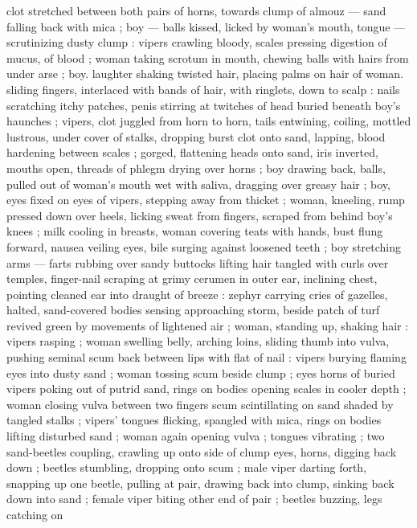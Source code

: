 clot stretched between both pairs of horns, towards clump of almouz 
--- sand falling back with mica ; boy --- balls kissed, licked by 
woman's mouth, tongue --- scrutinizing dusty clump : vipers crawling 
bloody, scales pressing digestion of mucus, of blood ; woman taking 
scrotum in mouth, chewing balls with hairs from under arse ; boy. 
laughter shaking twisted hair, placing palms on hair of woman. sliding 
fingers, interlaced with bands of hair, with ringlets, down to scalp : 
nails scratching itchy patches, penis stirring at twitches of head 
buried beneath boy's haunches ; vipers, clot juggled from horn to 
horn, tails entwining, coiling, mottled lustrous, under cover of stalks, 
dropping burst clot onto sand, lapping, blood hardening between 
scales ; gorged, flattening heads onto sand, iris inverted, mouths 
open, threads of phlegm drying over horns ; boy drawing back, balls, 
pulled out of woman's mouth wet with saliva, dragging over greasy 
hair ; boy, eyes fixed on eyes of vipers, stepping away from thicket ; 
woman, kneeling, rump pressed down over heels, licking sweat from 
fingers, scraped from behind boy's knees ; milk cooling in breasts, 
woman covering teats with hands, bust flung forward, nausea veiling 
eyes, bile surging against loosened teeth ; boy stretching arms --- 
farts rubbing over sandy buttocks{\comdash} lifting hair tangled with curls 
over temples, finger-nail scraping at grimy cerumen in outer ear, 
inclining chest, pointing cleaned ear into draught of breeze : zephyr 
carrying cries of gazelles, halted, sand-covered bodies sensing 
approaching storm, beside patch of turf revived green by 
movements of lightened air ; woman, standing up, shaking hair : 
vipers rasping ; woman swelling belly, arching loins, sliding thumb 
into vulva, pushing seminal scum back between lips with flat of nail : 
vipers burying flaming eyes into dusty sand ; woman tossing scum 
beside clump ; eyes horns of buried vipers poking out of putrid 
sand, rings on bodies opening scales in cooler depth ; woman closing 
vulva between two fingers {\col} scum scintillating on sand shaded by 
tangled stalks ; vipers' tongues flicking, spangled with mica, rings on 
bodies lifting disturbed sand ; woman again opening vulva ; tongues 
vibrating ; two sand-beetles coupling, crawling up onto side of clump 
{\col} eyes, horns, digging back down ; beetles stumbling, dropping onto 
scum ; male viper darting forth, snapping up one beetle, pulling at 
pair, drawing back into clump, sinking back down into sand ; female 
viper biting other end of pair ; beetles buzzing, legs catching on 
